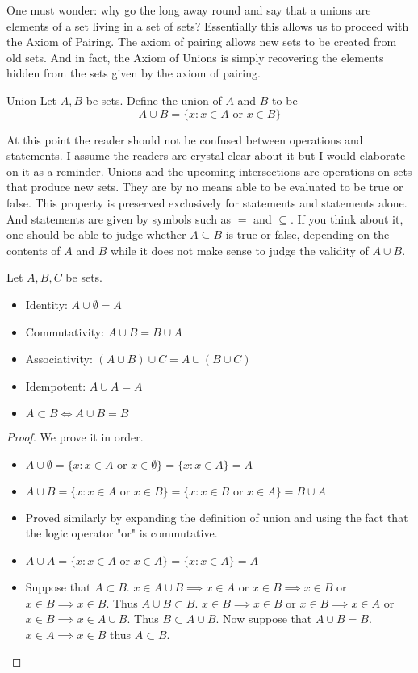 \documentclass[a4paper]{article}
\begin{document}
One must wonder: why go the long away round and say that a unions are elements of a set living in a set of sets? Essentially this allows us to proceed with the Axiom of Pairing. The axiom of pairing allows new sets to be created from old sets. And in fact, the Axiom of Unions is simply recovering the elements hidden from the sets given by the axiom of pairing. 

\begin{defn}{Union}{} Let $A,B$ be sets. Define the union of $A$ and $B$ to be $$A\cup B=\{x:x\in A\text{ or }x\in B\}$$
\end{defn}

At this point the reader should not be confused between operations and statements. I assume the readers are crystal clear about it but I would elaborate on it as a reminder. Unions and the upcoming intersections are operations on sets that produce new sets. They are by no means able to be evaluated to be true or false. This property is preserved exclusively for statements and statements alone. And statements are given by symbols such as $=$ and $\subseteq$. If you think about it, one should be able to judge whether $A\subseteq B$ is true or false, depending on the contents of $A$ and $B$ while it does not make sense to judge the validity of $A\cup B$. 

\begin{prp}{}{} Let $A,B,C$ be sets. 
\begin{itemize}
\item Identity: $A\cup\emptyset=A$
\item Commutativity: $A\cup B=B\cup A$
\item Associativity: $(A\cup B)\cup C=A\cup(B\cup C)$
\item Idempotent: $A\cup A=A$
\item $A\subset B\iff A\cup B=B$
\end{itemize}
\begin{proof} We prove it in order. 
\begin{itemize}
\item $A\cup\emptyset=\{x:x\in A\text{ or }x\in\emptyset\}=\{x:x\in A\}=A$
\item $A\cup B=\{x:x\in A\text{ or }x\in B\}=\{x:x\in B\text{ or }x\in A\}=B\cup A$
\item Proved similarly by expanding the definition of union and using the fact that the logic operator "or" is commutative. 
\item $A\cup A=\{x:x\in A\text{ or }x\in A\}=\{x:x\in A\}=A$
\item Suppose that $A\subset B$. $x\in A\cup B\implies x\in A$ or $x\in B\implies x\in B$ or $x\in B\implies x\in B$. Thus $A\cup B\subset B$. $x\in B\implies x\in B$ or $x\in B\implies x\in A$ or $x\in B\implies x\in A\cup B$. Thus $B\subset A\cup B$. Now suppose that $A\cup B=B$. $x\in A\implies x\in B$ thus $A\subset B$. 
\end{itemize}
\end{proof}
\end{prp}
\end{document}
